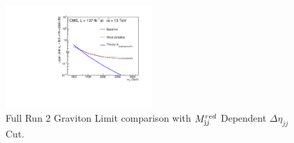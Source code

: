 \begin{figure}[!htb]
	\centering
	\includegraphics[width=0.5\textwidth]{Figures/limits_HH_combine_137fb_deltaEtaComparison_GravNar_fixedmredDeltaEtaCheckGraviton.pdf}
	\caption{Full Run 2 Graviton Limit comparison with $M_{\textrm jj}^{red}$ Dependent $\Delta \eta_{jj}$ Cut.}
	\label{fig:GravitonLimitFULLmred}
\end{figure}
\clearpage

